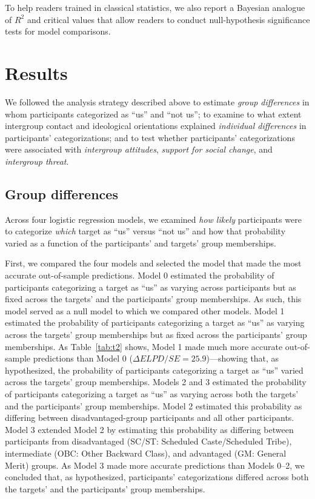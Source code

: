\documentclass[12pt, a4paper]{article}
\begin{document}
To help readers trained in classical statistics, we also report a Bayesian analogue of $R^2$ \parencite{gelman_r-squared_2019} and critical values that allow readers to conduct null-hypothesis significance tests for model comparisons.

\section{Results}

We followed the analysis strategy described above to estimate \emph{group differences }in whom participants categorized as “us” and “not us”;  to examine to what extent intergroup contact and ideological orientations explained \emph{individual differences} in participants’ categorizations; and to test whether participants’ categorizations were associated with \emph{intergroup attitudes}, \emph{support for social change}, and \emph{intergroup threat}.

\subsection{Group differences}

Across four logistic regression models, we examined \emph{how likely	} participants were to categorize \emph{which} target as “us” versus “not us” and how that probability varied as a function of the participants’ and targets’ group memberships.

First, we compared the four models and selected the model that made the most accurate out-of-sample predictions. Model 0 estimated the probability of participants categorizing a target as “us” as varying across participants but as fixed across the targets’ and the participants’ group memberships. As such, this model served as a null model to which we compared other models. Model 1 estimated the probability of participants categorizing a target as “us” as varying across the targets’ group memberships but as fixed across the participants’ group memberships. As Table~\ref{tab:t2} shows, Model 1 made much more accurate out-of-sample predictions than Model 0 ($\Delta\textit{ELPD}/\textit{SE} = 25.9$)---showing that, as hypothesized, the probability of participants categorizing a target as “us” varied across the targets’ group memberships. Models 2 and 3 estimated the probability of participants categorizing a target as “us” as varying across both the targets’ and the participants’ group memberships. Model 2 estimated this probability as differing between disadvantaged-group participants and all other participants. Model 3 extended Model 2 by estimating this probability as differing between participants from disadvantaged (SC/ST: Scheduled Caste/Scheduled Tribe), intermediate (OBC: Other Backward Class), and advantaged (GM: General Merit) groups. As Model 3 made more accurate predictions than Models 0--2, we concluded that, as hypothesized, participants’ categorizations differed across both the targets’ and the participants’ group memberships.
\end{document}
